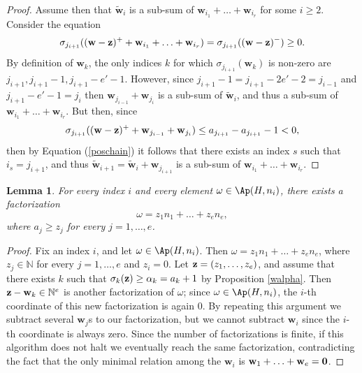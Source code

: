 \documentclass[11pt,twoside]{amsart}
\newcommand{\N}{\mathbb N}
\def\bw{{\mathbf w}}
\newtheorem{lem}[Theorem]{Lemma}
\theoremstyle{definition}
\numberwithin{equation}{section}
\begin{document}
\begin{proof}
Assume then that $\tilde{\bw}_i$ is a sub-sum of $\bw_{i_1}+\ldots+\bw_{i_r}$ for some $i \ge 2$. 
Consider the equation
\begin{equation}\label{poschain}
\sigma_{j_{i+1}}((\bw-{\bf z})^+ + \bw_{i_1}+\ldots+\bw_{i_r}) = \sigma_{j_{i+1}}((\bw-{\bf z})^-) \ge 0.
\end{equation}
By definition of $\bw_k$, the only indices $k$ for which $\sigma_{j_{i+1}}(\bw_k)$ is non-zero are $j_{i+1},j_{i+1}-1,j_{i+1}-e'-1$. However, since $j_{i+1}-1=j_{i+1}-2e'-2=j_{i-1}$ and $j_{i+1}-e'-1=j_i$ then $\bw_{j_{i-1}}+\bw_{j_i}$ is a sub-sum of $\tilde{\bw}_i$, and thus a sub-sum of $\bw_{i_1}+\ldots+\bw_{i_r}$. But then, since $$\sigma_{j_{i+1}}((\bw-{\bf z})^++\bw_{j_{i-1}}+\bw_{j_i}) \le a_{j_{i+1}}-a_{j_{i+1}}-1 < 0,$$
then by Equation (\ref{poschain}) it follows that there exists an index $s$ such that $i_s=j_{i+1}$, and thus $\tilde{\bw}_{i+1}=\tilde{\bw}_i+\bw_{j_{i+1}}$ is a sub-sum of $\bw_{i_1}+\ldots+\bw_{i_r}$.
\end{proof}
\begin{lem}\label{factorapery}
For every index $i$ and every element $\omega \in \Ap(H,n_i)$, there exists a factorization
$$\omega=z_1n_1+\ldots+z_en_e,$$
where $a_j \ge z_j$ for every $j=1,\ldots,e$. 
\end{lem}
\begin{proof}
Fix an index $i$, and let $\omega \in \Ap(H,n_i)$. Then $\omega=z_1n_1+\ldots+z_en_e$, where $z_j \in \N$ for every $j=1,\ldots,e$ and $z_i=0$. Let ${\bf z}=(z_1,\ldots,z_e)$, and assume that there exists $k$ such that $\sigma_k({\bf z})\ge \alpha_k = a_k+1$ by Proposition \ref{walpha}. Then ${\bf z}-\bw_k \in \N^e$ is another factorization of $\omega$; since $\omega \in \Ap(H,n_i)$, the $i$-th coordinate of this new factorization is again $0$. By repeating this argument we subtract several $\bw_j$s to our factorization, but we cannot subtract $\bw_i$ since the $i$-th coordinate is always zero. Since the number of factorizations is finite, if this algorithm does not halt we eventually reach the same factorization, contradicting the fact that the only minimal relation among the $\bw_i$ is $\bw_1+\ldots+\bw_e={\bf 0}$. 
\end{proof}
\end{document}
